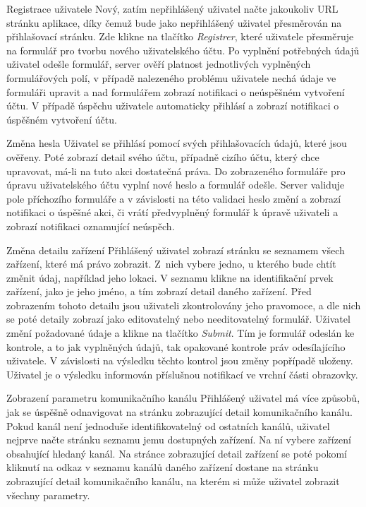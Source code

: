 \def\myprefix{UC}
\begin{enumfunctional}[style=nextline]
\item[Registrace uživatele] 
Nový, zatím nepřihlášený uživatel načte jakoukoliv URL stránku aplikace, díky čemuž bude jako nepřihlášený uživatel přesměrován na přihlašovací stránku. Zde klikne na tlačítko \emph{Registrer}, které uživatele přesměruje na formulář pro tvorbu nového uživatelského účtu. Po vyplnění potřebných údajů uživatel odešle formulář, server ověří platnost jednotlivých vyplněných formulářových polí, v případě nalezeného problému uživatele nechá údaje ve formuláři upravit a nad formulářem zobrazí notifikaci o neúspěšném vytvoření účtu. V případě úspěchu uživatele automaticky přihlásí a zobrazí notifikaci o úspěšném vytvoření účtu.
\item[Změna hesla]
Uživatel se přihlásí pomocí svých přihlašovacích údajů, které jsou ověřeny. Poté zobrazí detail svého účtu, případně cizího účtu, který chce upravovat, má-li na tuto akci dostatečná práva. Do zobrazeného formuláře pro úpravu uživatelského účtu vyplní nové heslo a formulář odešle. Server validuje pole příchozího formuláře a v závislosti na této validaci heslo změní a zobrazí notifikaci o úspěšné akci, či vrátí předvyplněný formulář k úpravě uživateli a zobrazí notifikaci oznamující neúspěch.
\item[Změna detailu zařízení]
Přihlášený uživatel zobrazí stránku se seznamem všech zařízení, které má právo zobrazit. Z~nich vybere jedno, u kterého bude chtít změnit údaj, například jeho lokaci. V seznamu klikne na identifikační prvek zařízení, jako je jeho jméno, a tím zobrazí detail daného zařízení. Před zobrazením tohoto detailu jsou uživateli zkontrolovány jeho pravomoce, a dle nich se poté detaily zobrazí jako editovatelný nebo needitovatelný formulář. Uživatel změní požadované údaje a klikne na tlačítko \emph{Submit}. Tím je formulář odeslán ke kontrole, a to jak vyplněných údajů, tak opakované kontrole práv odesílajícího uživatele. V závislosti na výsledku těchto kontrol jsou změny popřípadě uloženy. Uživatel je o výsledku informován příslušnou notifikací ve vrchní části obrazovky.
\item[Zobrazení parametru komunikačního kanálu]
Přihlášený uživatel má více způsobů, jak se úspěšně odnavigovat na stránku zobrazující detail komunikačního kanálu. Pokud kanál není jednoduše identifikovatelný od ostatních kanálů, uživatel nejprve načte stránku seznamu jemu dostupných zařízení. Na ní vybere zařízení obsahující hledaný kanál. Na stránce zobrazující detail zařízení se poté pokomí kliknutí na odkaz v seznamu kanálů daného zařízení dostane na stránku zobrazující detail komunikačního kanálu, na kterém si může uživatel zobrazit všechny parametry.

\end{enumfunctional}
